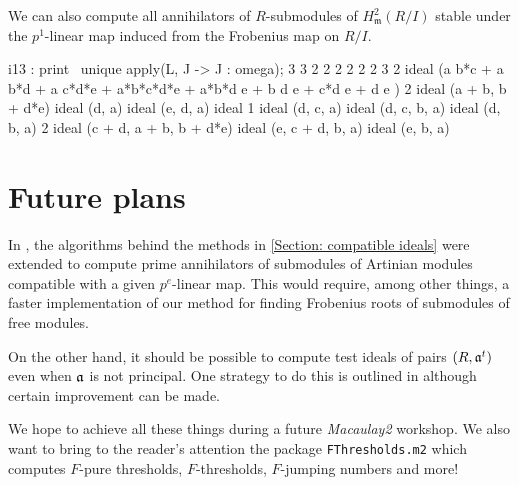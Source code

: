 \documentclass{amsart}
\begin{document}
\begin{example}
We can also compute  all annihilators of $R$-submodules of $H^2_{\mathfrak{m}} (R/I)$ stable under the $p^1$-linear map induced from the Frobenius map on $R/I$.

\medskip
{\small
\begin{MyVerbatim}
i13 : print \ unique apply(L, J -> J : omega);
        3       3       2                         2     2 2       2 2    3 2
ideal (a b*c + a b*d + a c*d*e + a*b*c*d*e + a*b*d e + b d e + c*d e  + d e )
               2
ideal (a + b, b  + d*e)
ideal (d, a)
ideal (e, d, a)
ideal 1
ideal (d, c, a)
ideal (d, c, b, a)
ideal (d, b, a)
                      2
ideal (c + d, a + b, b  + d*e)
ideal (e, c + d, b, a)
ideal (e, b, a)
\end{MyVerbatim}
}
\medskip

\end{example}

\section{Future plans}

In \cite{KatzmanZhangAlgorithm}, the algorithms behind the methods in \autoref{Section: compatible ideals} were extended
to compute prime annihilators of submodules of Artinian modules compatible with a given $p^{e}$-linear map.
This would require, among other things, a faster implementation of our method for finding Frobenius roots of submodules of free modules.

On the other hand, it should be possible to compute test ideals of pairs $(R, \mathfrak{a}^t)$ even when $\mathfrak{a}$ is not principal.  One strategy to do this is outlined in \cite{SchwedeTuckerTestIdealsOfNonPrincipal} although certain improvement can be made.

We hope to achieve all these things during a future \emph{Macaulay2} workshop.  We also want to bring to the reader's attention the package \texttt{FThresholds.m2} which computes $F$-pure thresholds, $F$-thresholds, $F$-jumping numbers and more!



\end{document}
